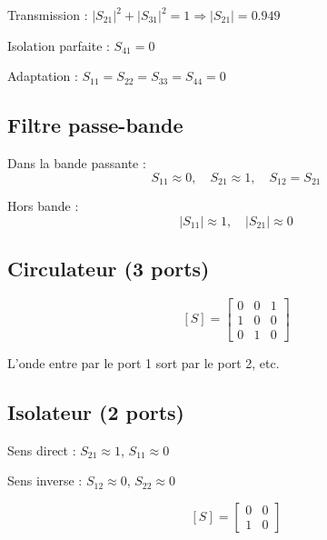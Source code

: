 \documentclass[12pt,a4paper]{article}
\begin{document}
Transmission : $|S_{21}|^2 + |S_{31}|^2 = 1 \Rightarrow |S_{21}| = 0.949$

Isolation parfaite : $S_{41} = 0$

Adaptation : $S_{11} = S_{22} = S_{33} = S_{44} = 0$

\subsection{Filtre passe-bande}

Dans la bande passante :
$$S_{11} \approx 0, \quad S_{21} \approx 1, \quad S_{12} = S_{21}$$

Hors bande :
$$|S_{11}| \approx 1, \quad |S_{21}| \approx 0$$

\subsection{Circulateur (3 ports)}

$$[S] = \begin{bmatrix}
0 & 0 & 1 \\
1 & 0 & 0 \\
0 & 1 & 0
\end{bmatrix}$$

L'onde entre par le port 1 sort par le port 2, etc.

\subsection{Isolateur (2 ports)}

Sens direct : $S_{21} \approx 1$, $S_{11} \approx 0$

Sens inverse : $S_{12} \approx 0$, $S_{22} \approx 0$

$$[S] = \begin{bmatrix}
0 & 0 \\
1 & 0
\end{bmatrix}$$
\end{document}
